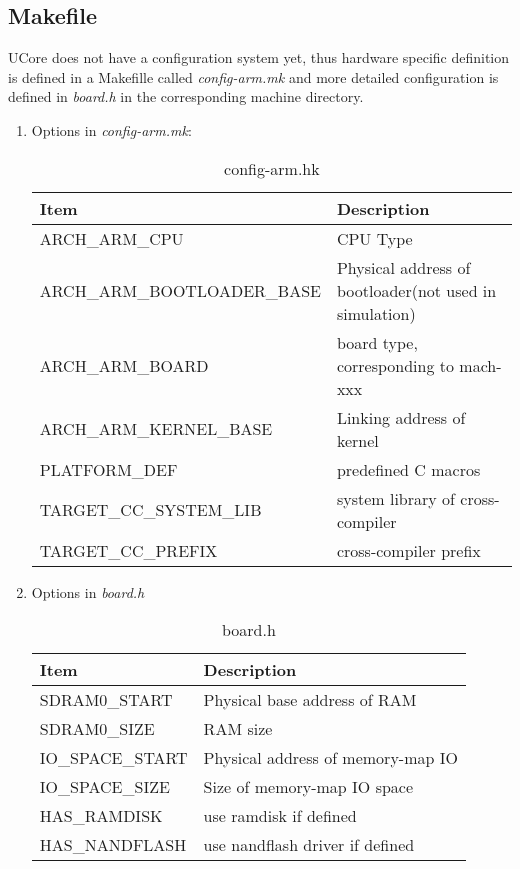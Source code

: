 \documentclass[a4paper]{article}
\begin{document}
\subsection{Makefile}
UCore does not have a configuration system yet, thus hardware specific
definition is defined in a Makefille called \emph{config-arm.mk} and
more detailed configuration is defined in \emph{board.h} in the 
corresponding machine directory.
\begin{enumerate}
  \item Options in \emph{config-arm.mk}:
    \begin{table}[h]
      \centering
      \begin{tabular}{|l|l|}
        \hline
        Item & Description \\
        \hline
        ARCH\_ARM\_CPU  & CPU Type \\
        ARCH\_ARM\_BOOTLOADER\_BASE & Physical address of bootloader(not used in simulation) \\
        ARCH\_ARM\_BOARD & board type, corresponding to mach-xxx \\
        ARCH\_ARM\_KERNEL\_BASE & Linking address of kernel \\
        PLATFORM\_DEF  &  predefined C macros \\
        \hline
        TARGET\_CC\_SYSTEM\_LIB & system library of cross-compiler \\
        TARGET\_CC\_PREFIX & cross-compiler prefix \\
        \hline
      \end{tabular}
      \caption{config-arm.hk}
      \label{tab:configarm.mk}
    \end{table}

  \item Options in \emph{board.h}
    \begin{table}[h]
      \centering
      \begin{tabular}{|l|l|}
        \hline
        Item & Description \\
        \hline
        SDRAM0\_START & Physical base address of RAM \\
        SDRAM0\_SIZE  & RAM size \\
        IO\_SPACE\_START & Physical address of memory-map IO \\
        IO\_SPACE\_SIZE  & Size of memory-map IO space \\
        HAS\_RAMDISK     & use ramdisk if defined \\
        HAS\_NANDFLASH   & use nandflash driver if defined \\
        \hline
      \end{tabular}
      \caption{board.h}
      \label{tab:board.h}
    \end{table}
\end{enumerate}
\end{document}
